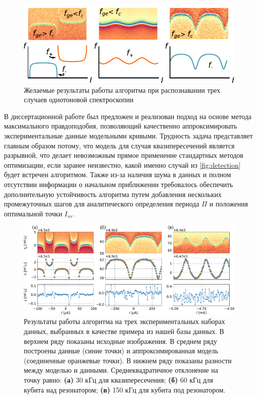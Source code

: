 \documentclass[14pt, a4paper]{extarticle}
\begin{document}
	
\begin{figure}
	\centering
	\includegraphics[width=.8\linewidth]{Pictures/detection}
	\caption{Желаемые результаты работы алгоритма при распознавании трех случаев однотоновой спектроскопии}
	\label{fig:detection}
	\end{figure}

В диссертационной работе был предложен и реализован подход на основе метода максимального правдоподобия, позволяющий качественно аппроксимировать экспериментальные данные модельными кривыми. Трудность задача представляет главным образом потому, что модель для случая квазипересечений является разрывной, что делает невозможным прямое применение стандартных методов оптимизации, если заранее неизвестно, какой именно случай из \autoref{fig:detection} будет встречен алгоритмом. Также из-за наличия шума в данных и полном отсутствии информации о начальном приближении требовалось обеспечить дополнительную устойчивость алгоритма путем добавления нескольких промежуточных шагов для аналитического определения периода $\Pi$ и положения оптимальной точки $I_{ss}$. 


\begin{figure}
	\centering
	\includegraphics[width=1\linewidth]{Pictures/fit_cases}
	\caption{Результаты работы алгоритма на трех экспериментальных наборах данных, выбранных в качестве примера из нашей базы данных. В верхнем ряду показаны исходные изображения. В среднем ряду построены данные (синие точки) и аппроксимированная модель (соединенные оранжевые точки). В нижнем ряду показаны разности между моделью и данными. Среднеквадратичное отклонение на точку равно: \textbf{(а)} 30 кГц для квазипересечения; \textbf{(б)} 60 кГц для кубита над резонатором; \textbf{(в)} 150 кГц для кубита под резонатором.}
	\label{fig:fitcases}
\end{figure}
\end{document}
